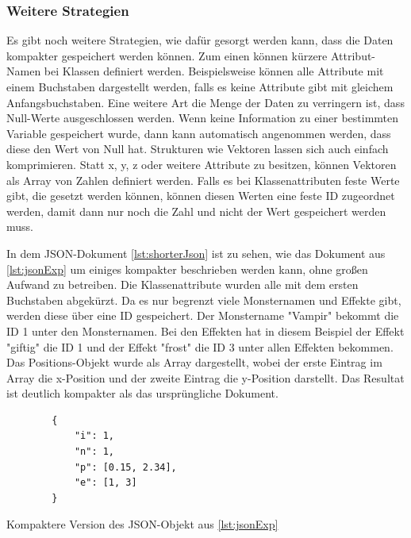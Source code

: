 \subsubsection{Weitere Strategien}
Es gibt noch weitere Strategien, wie dafür gesorgt werden kann, dass die Daten kompakter gespeichert werden können. Zum einen können kürzere Attribut-Namen bei Klassen definiert werden. Beispielsweise können alle Attribute mit einem Buchstaben dargestellt werden, falls es keine Attribute gibt mit gleichem Anfangsbuchstaben. Eine weitere Art die Menge der Daten zu verringern ist, dass Null-Werte ausgeschlossen werden. Wenn keine Information zu einer bestimmten Variable gespeichert wurde, dann kann automatisch angenommen werden, dass diese den Wert von Null hat. Strukturen wie Vektoren lassen sich auch einfach komprimieren. Statt x, y, z oder weitere Attribute zu besitzen, können Vektoren als Array von Zahlen definiert werden. Falls es bei Klassenattributen feste Werte gibt, die gesetzt werden können, können diesen Werten eine feste ID zugeordnet werden, damit dann nur noch die Zahl und nicht der Wert gespeichert werden muss.\cite{objelean2011json}\cite{baeldungReducingJSON}

In dem JSON-Dokument \ref{lst:shorterJson} ist zu sehen, wie das Dokument aus \ref{lst:jsonExp} um einiges kompakter beschrieben werden kann, ohne großen Aufwand zu betreiben. Die Klassenattribute wurden alle mit dem ersten Buchstaben abgekürzt. Da es nur begrenzt viele Monsternamen und Effekte gibt, werden diese über eine ID gespeichert. Der Monstername "Vampir" bekommt die ID 1 unter den Monsternamen. Bei den Effekten hat in diesem Beispiel der Effekt "giftig" die ID 1 und der Effekt "frost" die ID 3 unter allen Effekten bekommen. Das Positions-Objekt wurde als Array dargestellt, wobei der erste Eintrag im Array die x-Position und der zweite Eintrag die y-Position darstellt. Das Resultat ist deutlich kompakter als das ursprüngliche Dokument.

\begin{listing}[htp]
    \begin{verbatim}
        {
            "i": 1,
            "n": 1,
            "p": [0.15, 2.34],
            "e": [1, 3]
        }
    \end{verbatim}
    \caption{Kompaktere Version des JSON-Objekt aus \ref{lst:jsonExp}}
    \label{lst:shorterJson}
\end{listing}


